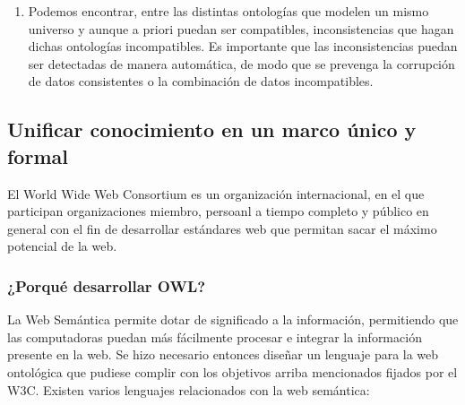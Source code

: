 \begin {enumerate}
     			Esto permite transformar, o si no al menos transportar conceptos desde unas hacia otras ontologías, creando de este modo una red de ontologías.
     	
     			\item Podemos encontrar, entre las distintas ontologías que modelen un mismo universo y aunque a priori puedan ser compatibles, inconsistencias que hagan dichas ontologías incompatibles. Es importante que las inconsistencias puedan ser detectadas de manera automática, de modo que se prevenga la corrupción de datos consistentes o la combinación de datos incompatibles.
     		 
		\end{enumerate}
      
	\subsection{Unificar conocimiento en un marco único y formal}
	
	El World Wide Web Consortium es un organización internacional, en el que participan organizaciones miembro, persoanl a tiempo completo y público en general con el fin de desarrollar estándares web que permitan sacar el máximo potencial de la web. 
		
		\subsubsection{¿Porqué desarrollar OWL?}
		
		La Web Semántica permite dotar de significado a la información, permitiendo que las computadoras puedan más fácilmente procesar e integrar la información presente en la web. Se hizo necesario entonces diseñar un lenguaje para la web ontológica que pudiese complir con los objetivos arriba mencionados fijados por el W3C. Existen varios lenguajes relacionados con la web semántica:
		
